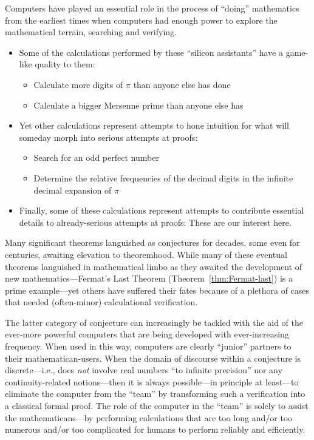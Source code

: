 Computers have played an essential role in the process of ``doing''
mathematics from the earliest times when computers had enough power to
explore the mathematical terrain, searching and verifying.
\begin{itemize}
\item
Some of the calculations performed by these ``silicon assistants''
have a game-like quality to them:
  \begin{itemize}
  \item
Calculate more digits of $\pi$ than anyone else has done
  \item
Calculate a bigger Mersenne prime than anyone else has
  \end{itemize}

\item
Yet other calculations represent attempts to hone intuition for what
will someday morph into serious attempts at proofs:
  \begin{itemize}
  \item
Search for an odd perfect number
  \item
Determine the relative frequencies of the decimal digits in the
infinite decimal expansion of $\pi$
  \end{itemize}

\item
Finally, some of these calculations represent attempts to contribute
essential details to already-serious attempts at proofs: These are our
interest here.
\end{itemize}

Many significant theorems languished as conjectures for decades, some
even for centuries, awaiting elevation to theoremhood.  While many of
these eventual theorems languished in mathematical limbo as they
awaited the development of new mathematics---Fermat's Last Theorem
(Theorem~\ref{thm:Fermat-last}) is a prime example---yet others have
suffered their fates because of a plethora of cases that needed
(often-minor) calculational verification.

The latter category of conjecture can increasingly be tackled with the
aid of the ever-more powerful computers that are being developed with
ever-increasing frequency.  When used in this way, computers are
clearly ``junior'' partners to their mathematican-users.  When the
domain of discourse within a conjecture is discrete---i.e., does {\em
  not} involve real numbers ``to infinite precision'' nor any
continuity-related notions---then it is always possible---in principle
at least---to eliminate the computer from the ``team'' by transforming
such a verification into a classical formal proof.  The role of the
computer in the ``team'' is solely to assist the mathematicans---by
performing calculations that are too long and/or too numerous and/or
too complicated for humans to perform reliably and efficiently.

